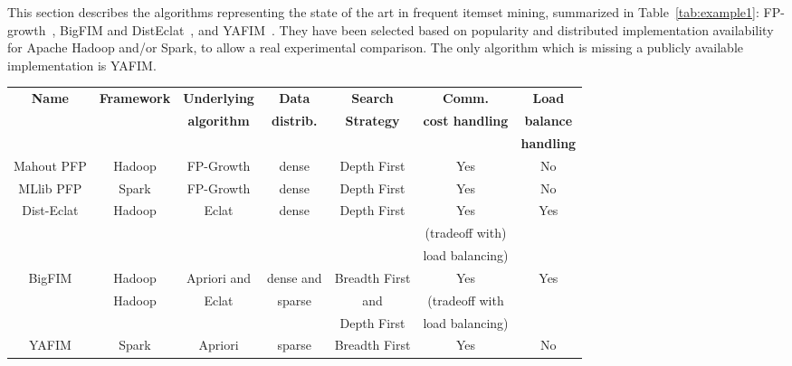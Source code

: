 
This section describes the algorithms representing the state of the art
in frequent itemset mining, summarized in Table~\ref{tab:example1}:
FP-growth~\cite{Han00},
BigFIM and DistEclat~\cite{bigfim},
and YAFIM~\cite{YAFIM}.
They have been selected based on popularity
and distributed implementation availability
for Apache Hadoop and/or Spark, to allow a real experimental comparison.
The only algorithm which is missing a publicly available implementation is YAFIM.




\begin{table*}[]
\scriptsize
\centering
\caption{Algorithm comparison summary. \label{tab:example1}}
\begin{tabular}{| c|c|c|c|c|c|c|}
\hline {\bf Name} & {\bf Framework} & {\bf Underlying} & {\bf Data} & {\bf Search} & {\bf Comm.} & {\bf Load  }\\
& & {\bf algorithm} & {\bf distrib.} & {\bf Strategy} & {\bf cost handling} & {\bf balance}\\
& & &&& & {\bf handling}\\
\hline
\hline Mahout PFP & Hadoop & FP-Growth & dense & Depth First & Yes & No\\
\hline MLlib PFP & Spark & FP-Growth & dense & Depth First & Yes & No\\
\hline Dist-Eclat & Hadoop & Eclat & dense & Depth First & Yes & Yes \\
 &  &  &  &  & (tradeoff with) &  \\
 &  &  &  &  & load balancing) &  \\
\hline BigFIM & Hadoop & Apriori and & dense and  & Breadth First & Yes & Yes\\
  & Hadoop & Eclat & sparse &  and &  (tradeoff  with & \\
   &  &  &  &Depth First  & load balancing) &  \\
\hline YAFIM & Spark & Apriori & sparse & Breadth First & Yes & No\\
\hline
\end{tabular}
\end{table*}


